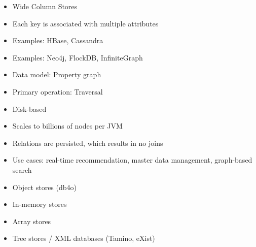 \begin{breakbox}
\begin{itemize}
	\item Wide Column Stores
	\item Each key is associated with multiple attributes
	\item Examples: HBase, Cassandra
\end{itemize}
\end{breakbox}

\begin{breakbox}
\begin{itemize}
	\item Examples: Neo4j, FlockDB, InfiniteGraph
\end{itemize}
\end{breakbox}

\begin{breakbox}
\begin{itemize}
	\item Data model: Property graph
	\item Primary operation: Traversal
	\item Disk-based
	\item Scales to billions of nodes per JVM
	\item Relations are persisted, which results in no joins
\end{itemize}

\begin{itemize}
	\item Use cases: real-time recommendation, master data management, graph-based search
\end{itemize}
\end{breakbox}

\begin{breakbox}
\begin{itemize}
	\item Object stores (db4o)
	\item In-memory stores
	\item Array stores
	\item Tree stores / XML databases (Tamino, eXist)
\end{itemize}
\end{breakbox}

